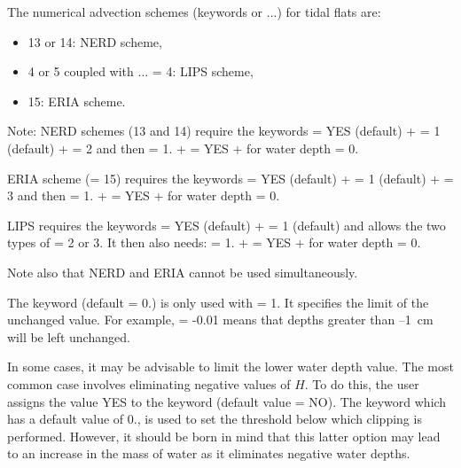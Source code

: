 The numerical advection schemes (keywords 
or ...) for tidal flats are:
\begin{itemize}
\item 13 or 14: NERD scheme,
\item 4 or 5 coupled with ... = 4:
LIPS scheme,
\item 15: ERIA scheme.
\end{itemize}

\begin{WarningBlock}{Note:}
NERD schemes (13 and 14) require the keywords
   = YES (default)
+  = 1 (default)
+  = 2 and then
   = 1.
+  = YES
+  for water depth = 0.

ERIA scheme (= 15) requires the keywords
   = YES (default)
+  = 1 (default)
+  = 3 and then
   = 1.
+  = YES
+  for water depth = 0.

LIPS requires the keywords
   = YES (default)
+  = 1 (default)
and allows the two types of  = 2 or 3.
It then also needs:
   = 1.
+  = YES
+  for water depth = 0.

Note also that NERD and ERIA cannot be used simultaneously.
\end{WarningBlock}

The keyword  (default = 0.)
is only used with  = 1.
It specifies the limit of the unchanged value.
For example,  = -0.01 means
that depths greater than --1~cm will be left unchanged.

In some cases, it may be advisable to limit the lower water depth value.
The most common case involves eliminating negative values of $H$.
To do this, the user assigns the value YES to the keyword 
(default value = NO).
The keyword  which has a default value of 0.,
is used to set the threshold below which clipping is performed.
However, it should be born in mind that this latter option may lead
to an increase in the mass of water as it eliminates negative water depths.

